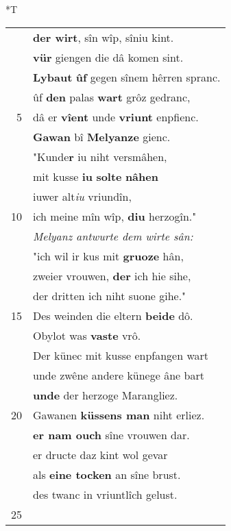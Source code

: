 \documentclass[8pt,a4paper,notitlepage]{article}
\begin{document}
\begin{table}[ht]
\begin{minipage}[t]{0.5\linewidth}
\end{minipage}
\hspace{0.5cm}
\begin{minipage}[t]{0.5\linewidth}
\small
\begin{center}*T
\end{center}
\begin{tabular}{rl}
 & \textbf{der wirt}, sîn wîp, sîniu kint.\\ 
 & \textbf{vür} giengen die dâ komen sint.\\ 
 & \textbf{Lybaut} \textbf{ûf} gegen sînem hêrren spranc.\\ 
 & ûf \textbf{den} palas \textbf{wart} grôz gedranc,\\ 
5 & dâ er \textbf{vîent} unde \textbf{vriunt} enpfienc.\\ 
 & \textbf{Gawan} bî \textbf{Melyanze} gienc.\\ 
 & "Kunde\textbf{r} iu niht versmâhen,\\ 
 & mit kusse \textbf{iu} \textbf{solte} \textbf{nâhen}\\ 
 & iuwer alt\textit{iu} vriundîn,\\ 
10 & ich meine mîn wîp, \textbf{diu} herzogîn."\\ 
 & \textit{Melyanz antwurte dem wirte sân:}\\ 
 & "ich wil ir kus mit \textbf{gruoze} hân,\\ 
 & zweier vrouwen, \textbf{der} ich hie sihe,\\ 
 & der dritten ich niht suone gihe."\\ 
15 & Des weinden die eltern \textbf{beide} dô.\\ 
 & Obylot was \textbf{vaste} vrô.\\ 
 & Der künec mit kusse enpfangen wart\\ 
 & unde zwêne andere künege âne bart\\ 
 & \textbf{unde} der herzoge Marangliez.\\ 
20 & Gawanen \textbf{küssens man} niht erliez.\\ 
 & \textbf{er nam ouch} sîne vrouwen dar.\\ 
 & er dructe daz kint wol gevar\\ 
 & als \textbf{eine tocken} an sîne brust.\\ 
 & des twanc in vriuntlîch gelust.\\ 
25 & \textbf{\begin{large}G\end{large}awan} ze Melyanze sprach:\\ 

\end{tabular}
\end{minipage}
\end{table}
\end{document}
